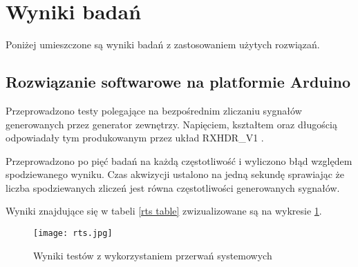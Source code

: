 \section{Wyniki badań}

Poniżej umieszczone są wyniki badań z zastosowaniem użytych rozwiązań. 

\subsection{Rozwiązanie softwarowe na platformie Arduino}

Przeprowadzono testy polegające na bezpośrednim zliczaniu sygnałów generowanych przez generator zewnętrzy. 
Napięciem, kształtem oraz długością odpowiadały tym produkowanym przez układ RXHDR\_V1 \cite{master}.

Przeprowadzono po pięć badań na każdą częstotliwość i wyliczono błąd względem spodziewanego wyniku. 
Czas akwizycji ustalono na jedną sekundę sprawiając że liczba spodziewanych zliczeń jest równa częstotliwości generowanych sygnałów.

Wyniki znajdujące się w tabeli \ref{rts table} zwizualizowane są na wykresie \ref{rts wyniki}.


\begin{figure}[]
        \centering
        \texttt{[image: rts.jpg]}
        \caption{Wyniki testów z wykorzystaniem przerwań systemowych}
        \label{rts wyniki}
\end{figure}

